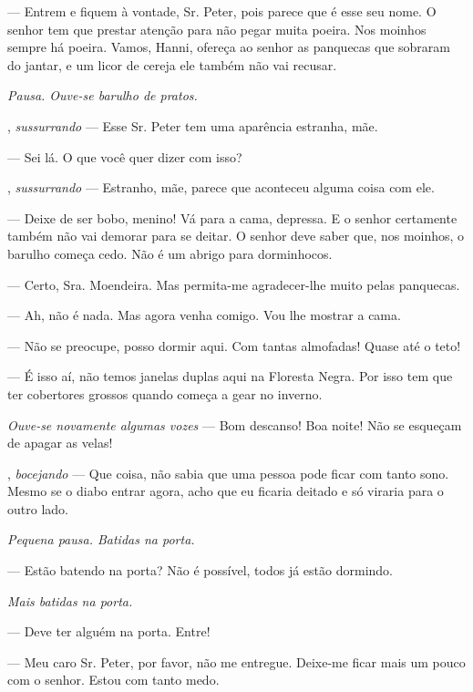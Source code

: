 \begin{myparindent}{0pt}
\begin{Parskip}
 --- Entrem e fiquem à vontade, Sr. Peter, pois parece que é
esse seu nome. O senhor tem que prestar atenção para não pegar muita
poeira. Nos moinhos sempre há poeira. Vamos, Hanni, ofereça ao senhor as
panquecas que sobraram do jantar, e um licor de cereja ele também não
vai recusar.

\emph{Pausa. Ouve-se barulho de pratos.}

, \emph{sussurrando} --- Esse Sr. Peter tem uma
aparência estranha, mãe.

 --- Sei lá. O que você quer dizer com isso?

, \emph{sussurrando} --- Estranho, mãe, parece que
aconteceu alguma coisa com ele.

 --- Deixe de ser bobo, menino! Vá para a cama, depressa. E o
senhor certamente também não vai demorar para se deitar. O senhor deve
saber que, nos moinhos, o barulho começa cedo. Não é um abrigo para
dorminhocos.

 --- Certo, Sra. Moendeira. Mas permita-me
agradecer-lhe muito pelas panquecas.

 --- Ah, não é nada. Mas agora venha comigo. Vou lhe mostrar a
cama.

 --- Não se preocupe, posso dormir aqui. Com tantas
almofadas! Quase até o teto!

 --- É isso aí, não temos janelas duplas aqui na Floresta Negra.
Por isso tem que ter cobertores grossos quando começa a gear no inverno.

\emph{Ouve-se novamente algumas vozes} --- Bom descanso! Boa noite! Não
se esqueçam de apagar as velas!

, \emph{bocejando} --- Que coisa, não sabia que uma
pessoa pode ficar com tanto sono. Mesmo se o diabo entrar agora, acho
que eu ficaria deitado e só viraria para o outro lado.

\emph{Pequena pausa. Batidas na porta.}

 --- Estão batendo na porta? Não é possível, todos já
estão dormindo.

\emph{Mais batidas na porta.}

 --- Deve ter alguém na porta. Entre!

 --- Meu caro Sr. Peter, por favor, não me entregue.
Deixe-me ficar mais um pouco com o senhor. Estou com tanto medo.


\end{Parskip}
\end{myparindent}
